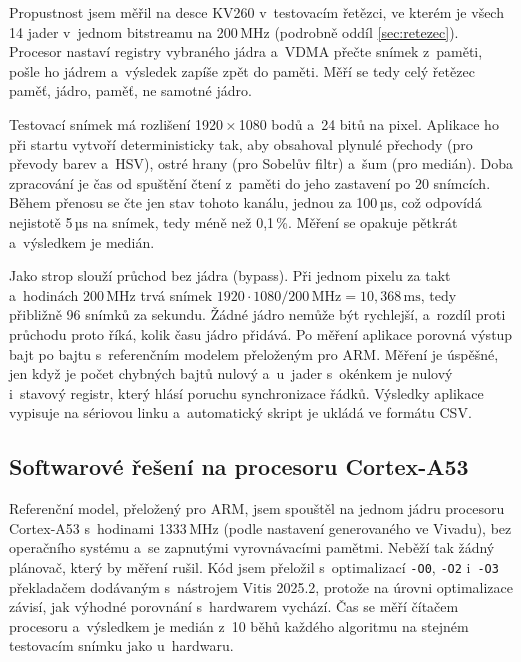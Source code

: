 \documentclass[FM,DP]{tulthesis}
\begin{document}
Propustnost jsem měřil na desce KV260 v~testovacím řetězci, ve kterém je všech
14 jader v~jednom bitstreamu na 200\,MHz (podrobně oddíl \ref{sec:retezec}).
Procesor nastaví registry vybraného jádra a~\ac{VDMA} přečte snímek z~paměti,
pošle ho jádrem a~výsledek zapíše zpět do paměti. Měří se tedy celý řetězec
paměť, jádro, paměť, ne samotné jádro.

Testovací snímek má rozlišení 1920\,×\,1080 bodů a~24 bitů na pixel. Aplikace
ho při startu vytvoří deterministicky tak, aby obsahoval plynulé přechody (pro
převody barev a~HSV), ostré hrany (pro Sobelův filtr) a~šum (pro medián). Doba
zpracování je čas od spuštění čtení z~paměti do jeho zastavení po 20 snímcích.
Během přenosu se čte jen stav tohoto kanálu, jednou za 100\,µs, což odpovídá
nejistotě 5\,µs na snímek, tedy méně než 0,1\,\%. Měření se opakuje pětkrát
a~výsledkem je medián.

Jako strop slouží průchod bez jádra (bypass). Při jednom pixelu za takt
a~hodinách 200\,MHz trvá snímek \mbox{$1920 \cdot 1080 / 200\,\mathrm{MHz} =
        10{,}368\,\mathrm{ms}$}, tedy přibližně 96 snímků za sekundu. Žádné jádro
nemůže být rychlejší, a~rozdíl proti průchodu proto říká, kolik času jádro
přidává. Po měření aplikace porovná výstup bajt po bajtu s~referenčním modelem
přeloženým pro ARM. Měření je úspěšné, jen když je počet chybných bajtů nulový
a~u~jader s~okénkem je nulový i~stavový registr, který hlásí poruchu
synchronizace řádků. Výsledky aplikace vypisuje na sériovou linku a~automatický
skript je ukládá ve formátu CSV.

\subsection{Softwarové řešení na procesoru Cortex-A53}
\label{sec:sw}

Referenční model, přeložený pro ARM, jsem spouštěl na jednom jádru procesoru
Cortex-A53 s~hodinami 1333\,MHz (podle nastavení generovaného ve Vivadu), bez
operačního systému a~se zapnutými vyrovnávacími pamětmi. Neběží tak žádný
plánovač, který by měření rušil. Kód jsem přeložil s~optimalizací \texttt{-O0},
\texttt{-O2} i~\texttt{-O3} překladačem dodávaným s~nástrojem Vitis 2025.2,
protože na úrovni optimalizace závisí, jak výhodné porovnání s~hardwarem
vychází. Čas se měří čítačem procesoru a~výsledkem je medián z~10 běhů každého
algoritmu na stejném testovacím snímku jako u~hardwaru.
\end{document}
